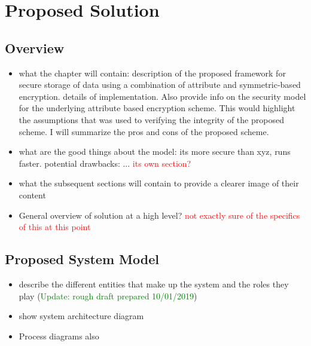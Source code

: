 \chapter{Proposed Solution}
\label{chap:proposed_solution}

\renewcommand{\theenumi}{\Alph{enumi}}
\renewcommand{\theenumii}{\roman{enumii}}

\section{Overview}

\begin{itemize}
	\item what the chapter will contain: description of the proposed framework for secure storage of data using a combination of attribute and symmetric-based encryption.  details of implementation. Also provide info on the security model for the underlying attribute based encryption scheme. This would highlight the assumptions that was used to verifying the integrity of the proposed scheme. I will summarize the pros and cons of the proposed scheme.
	
	\item what are the good things about the model: its more secure than xyz, runs faster. potential drawbacks: ... \textcolor{red}{its own section?}
	
	\item what the subsequent sections will contain to provide a clearer image of their content
\end{itemize}

\begin{itemize}
	\item General overview of solution at a high level? \textcolor{red}{not exactly sure of the specifics of this at this point}
\end{itemize}

\section{Proposed System Model}

\begin{itemize}
	\item describe the different entities that make up the system and the roles they play (\textcolor{green}{Update: rough draft prepared 10/01/2019})
	\item show system architecture diagram
	\item Process diagrams also
\end{itemize}


